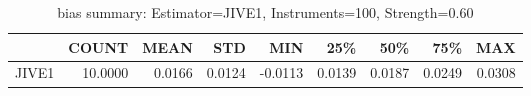 \begin{table}[ht]
\centering
\caption{bias summary: Estimator=JIVE1, Instruments=100, Strength=0.60}
\begin{tabular}{lrrrrrrrr}
\toprule
 & COUNT & MEAN & STD & MIN & 25\% & 50\% & 75\% & MAX \\
\midrule
JIVE1 & 10.0000 & 0.0166 & 0.0124 & -0.0113 & 0.0139 & 0.0187 & 0.0249 & 0.0308 \\
\bottomrule
\end{tabular}
\end{table}
